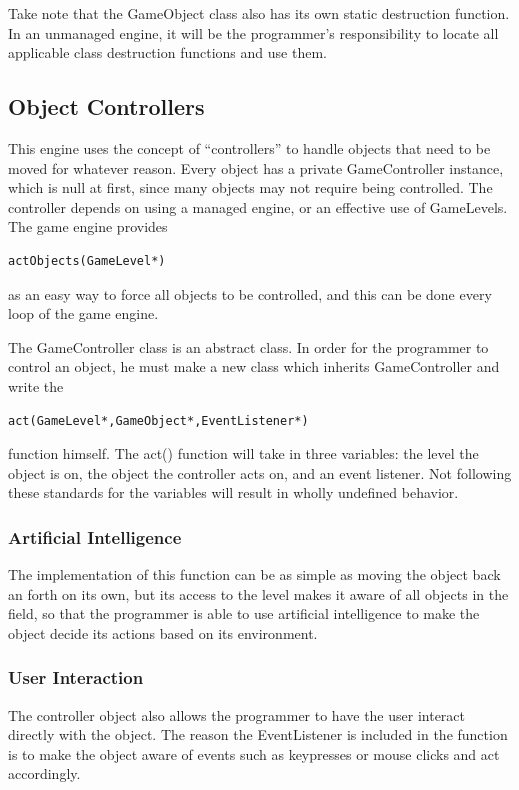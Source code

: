 \documentclass[12pt]{article}
\begin{document}
Take note that the GameObject class also has its own static destruction function. In an unmanaged engine, it will be the programmer's responsibility to locate all applicable class destruction functions and use them.

\subsection{Object Controllers}
This engine uses the concept of ``controllers'' to handle objects that need to be moved for whatever reason. Every object has a private GameController instance, which is null at first, since many objects may not require being controlled. The controller depends on using a managed engine, or an effective use of GameLevels. The game engine provides \begin{verbatim}actObjects(GameLevel*)\end{verbatim} as an easy way to force all objects to be controlled, and this can be done every loop of the game engine.

The GameController class is an abstract class. In order for the programmer to control an object, he must make a new class which inherits GameController and write the \begin{verbatim}act(GameLevel*,GameObject*,EventListener*)\end{verbatim} function himself. The act() function will take in three variables: the level the object is on, the object the controller acts on, and an event listener. Not following these standards for the variables will result in wholly undefined behavior.

\subsubsection{Artificial Intelligence}
The implementation of this function can be as simple as moving the object back an forth on its own, but its access to the level makes it aware of all objects in the field, so that the programmer is able to use artificial intelligence to make the object decide its actions based on its environment.

\subsubsection{User Interaction}
The controller object also allows the programmer to have the user interact directly with the object. The reason the EventListener is included in the function is to make the object aware of events such as keypresses or mouse clicks and act accordingly.
\end{document}
